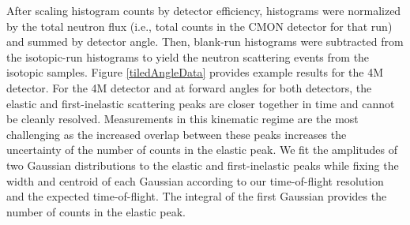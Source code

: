 %

After scaling histogram counts by detector efficiency, histograms were
normalized by the total neutron flux
(i.e., total counts in the CMON detector for that run) and summed by detector
angle. Then, blank-run histograms
were subtracted from the isotopic-run histograms to yield the neutron scattering
events from the isotopic samples. Figure \ref{tiledAngleData} provides example 
results for the 4M detector.
For the 4M detector and at forward angles for both detectors, the elastic
and first-inelastic scattering peaks
are closer together in time and cannot be cleanly resolved.
Measurements in this
kinematic regime are the most challenging as the increased overlap between
these peaks increases the uncertainty of the number of counts in the elastic
peak. We fit the amplitudes of two Gaussian distributions to the elastic and
first-inelastic peaks while fixing
the width and centroid of each Gaussian according to our time-of-flight resolution and
the expected time-of-flight. The integral of the first Gaussian provides the
number of counts in the elastic peak.

